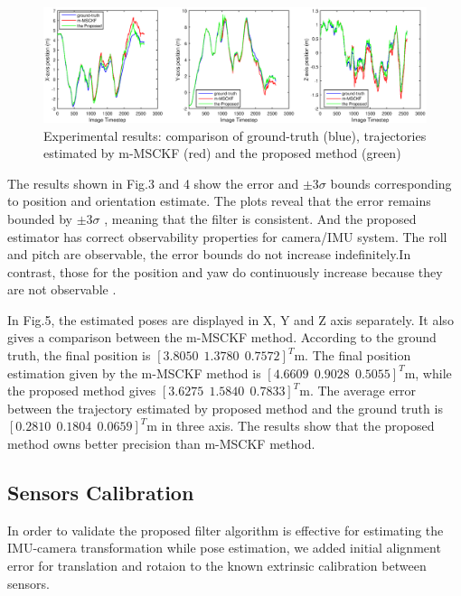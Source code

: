 \documentclass[a4paper, 10pt, conference]{ieeeconf}      %
\begin{document}
\begin{figure}[htbp] %
	\centering
	\includegraphics[width=1\linewidth]{3axis.eps} %
	\caption{Experimental results: comparison of  ground-truth (blue), trajectories estimated by m-MSCKF (red) and the proposed method (green)}
	\label{fig2}
\end{figure}

The results shown in Fig.3 and 4 show the error and $ \pm 3 \sigma $ bounds corresponding to position and orientation estimate. The plots reveal that the error remains bounded by $ \pm 3 \sigma $ , meaning that the filter is consistent. And the proposed estimator has correct observability properties for camera/IMU system. The roll and pitch are observable, the error bounds do not increase indefinitely.In contrast, those for the position and yaw do continuously increase because they are not observable \cite{kelly2011visual}.



In Fig.5, the estimated poses are displayed in X, Y and Z axis separately. It also gives a comparison between the m-MSCKF method. According to the ground truth, the final position is $ [3.8050 \ \   1.3780  \ \  0.7572]^T  $m. The final position estimation given by the m-MSCKF method is  $ [4.6609  \ \  0.9028    \ \ 0.5055]^T  $m, while the proposed method gives  $ [ 3.6275 \ \   1.5840  \ \  0.7833]^T  $m. The average error between the trajectory estimated by proposed method and the ground truth is $ [0.2810 \ \ 0.1804
\ \  0.0659]^T $m in three axis. The results show that the proposed method owns better  precision than m-MSCKF method.
 

 
 
\subsection{Sensors Calibration}

In order to validate the proposed filter algorithm is effective for estimating the IMU-camera transformation  while pose estimation, we added initial alignment error for translation and rotaion to the known extrinsic  calibration between sensors. 
\end{document}
